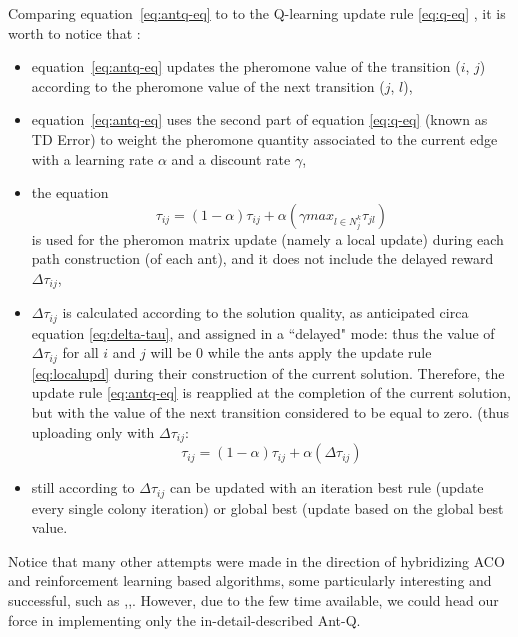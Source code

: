 Comparing equation~\ref{eq:antq-eq} to to the Q-learning update rule \ref{eq:q-eq} , it is worth to notice that :
\begin{itemize}
\item  equation~\ref{eq:antq-eq}  updates the pheromone  value  of  the  transition  ($i$, $j$)  according to the  pheromone  value  of  the  next transition  ($j$, $ l$),
\item equation~\ref{eq:antq-eq} uses  the second part of equation \ref{eq:q-eq} (known as TD Error) to  weight the  pheromone  quantity associated  to  the current  edge  with  a learning  rate $\alpha$  and  a discount  rate $\gamma$, 
\item the equation 
\begin{equation}
\tau_{ij}= (1-\alpha) \tau_{ij} + \alpha(\gamma max_{l\in N^k_j}\tau_{jl}) 
\label{eq:localupd}
\end{equation}
is used for the pheromon matrix update (namely a local update) during each path construction (of each ant), and it does not include the delayed reward $\Delta \tau_{ij}$,
\item $\Delta \tau_{ij}$ is calculated according to the solution quality, as anticipated circa equation \ref{eq:delta-tau}, and assigned in a ``delayed" mode: thus the value of $\Delta \tau_{ij}$  for all $i$ and $j$ will be $0$ while the ants  apply  the  update  rule \ref{eq:localupd}  during  their  construction  of the  current solution. 
Therefore, the update rule \ref{eq:antq-eq}	 is reapplied at the completion of the current solution, but with the value of the next transition considered to be equal to zero. (thus uploading only with $\Delta \tau_{ij}$:
\begin{equation}
\tau_{ij}= (1-\alpha) \tau_{ij} + \alpha(\Delta\tau_{ij}) 
\label{eq:antq-delay}
\end{equation}

\item still according to \cite{undici} \cite{diciotto} $\Delta \tau_{ij}$ can be updated with an iteration  best  rule (update every single colony iteration) or  global  best (update based on the global best value.
\end{itemize}

Notice that many other attempts were made in the direction of hybridizing ACO and reinforcement learning based algorithms, some particularly interesting and successful, such as \cite{quattordici},\cite{quindici},\cite{sedici}. However, due to the few time available, we could head our force in implementing only the in-detail-described Ant-Q.

